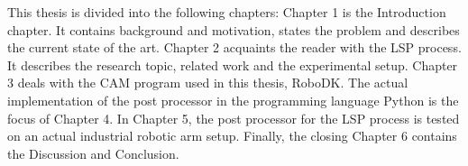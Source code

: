 This thesis is divided into the following chapters: Chapter 1 is the Introduction chapter. It contains background and motivation, states the problem and describes the current state of the art.
Chapter 2 acquaints the reader with the LSP process.  It describes the research topic, related work and the experimental setup. 
Chapter 3 deals with the CAM program used in this thesis, RoboDK. The actual implementation of the post processor in the programming language Python is the focus of Chapter 4. In Chapter 5, the post processor for the LSP process is tested on an actual industrial robotic arm setup. Finally, the closing Chapter 6 contains the Discussion and Conclusion. 
